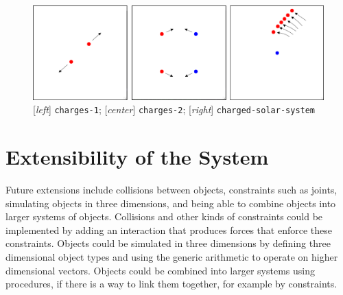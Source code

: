 \documentclass{article}
\begin{document}
\begin{figure}[h!]
  \centering
 \includegraphics[width=\textwidth,height=\textheight,keepaspectratio]{figs/charges.png}
  \caption{[\textit{left}] \texttt{charges-1}; [\textit{center}] \texttt{charges-2}; [\textit{right}] \texttt{charged-solar-system}}
  \label{figure:charges}
\end{figure}


\section{Extensibility of the System}
Future extensions include collisions between objects, constraints such as joints, simulating objects in three dimensions, and being able to combine objects into larger systems of objects. Collisions and other kinds of constraints could be implemented by adding an interaction that produces forces that enforce these constraints. Objects could be simulated in three dimensions by defining three dimensional object types and using the generic arithmetic to operate on higher dimensional vectors. Objects could be combined into larger systems using procedures, if there is a way to link them together, for example by constraints.
\end{document}

